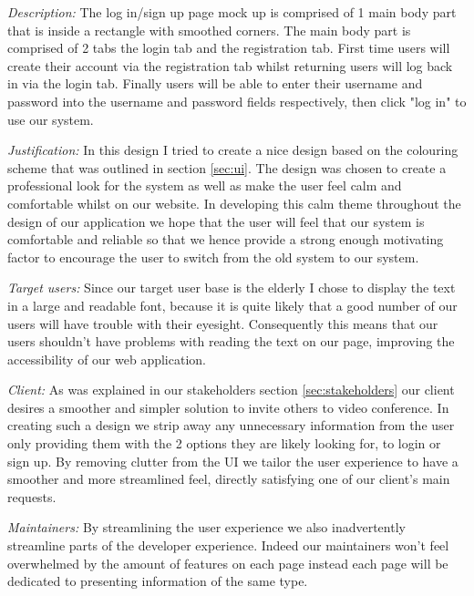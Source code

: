 \textit{Description:}
The log in/sign up page mock up is comprised of 1 main
body part that is inside a rectangle with smoothed corners.
The main body part is comprised of 2 tabs the login tab and
the registration tab. First time users will create their
account via the registration tab whilst returning users will
log back in via the login tab. Finally users will be able to
enter their username and password into the username and
password fields respectively, then click "log in" to use our
system.
\\ \vspace{0.2cm}

\textit{Justification:}
In this design I tried to create a nice design based on
the colouring scheme that was outlined in section \ref{sec:ui}.
The design was chosen to create a professional look for the
system as well as make the user feel calm and comfortable
whilst on our website. In developing this calm theme
throughout the design of our application we hope that
the user will feel that our system is comfortable and
reliable so that we hence provide a strong enough
motivating factor to encourage the user to switch from
the old system to our system.\\ \vspace{0.2cm}

\textit{Target users:}
Since our target user base is the elderly I chose to display
the text in a large and readable font, because it is quite
likely that a good number of our users will have trouble
with their eyesight. Consequently this means that our
users shouldn't have problems with reading the text on our
page, improving the accessibility of our web application.
\\ \vspace{0.2cm}

\textit{Client:}
As was explained in our stakeholders section \ref{sec:stakeholders}
our client desires a smoother and simpler solution to
invite others to video conference. In creating such a design
we strip away any unnecessary information from the user
only providing them with the 2 options they are likely
looking for, to login or sign up. By removing clutter
from the UI we tailor the user experience to have a
smoother and more streamlined feel, directly satisfying one
of our client's main requests.
\\ \vspace{0.2cm}

\textit{Maintainers:} By streamlining the user experience
we also inadvertently streamline parts of the developer
experience. Indeed our maintainers won't feel overwhelmed by
the amount of features on each page instead each page will be
dedicated to presenting information of the same type.
\\ \vspace{0.2cm}

